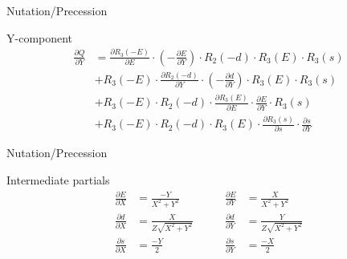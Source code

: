 \documentclass[14pt,table,t, c]{beamer}
\begin{document}
\begin{frame}{Nutation/Precession}
\begin{block}{Y-component}
\vspace*{-\baselineskip}\setlength\belowdisplayskip{0pt}\setlength\abovedisplayskip{0pt}
\begin{align*}
\frac{\partial Q}{\partial Y}
&= \frac{\partial R_3(-E)}{\partial E} \cdot (-\frac{\partial E}{\partial Y}) \cdot R_2(-d) \cdot R_3(E) \cdot R_3(s) \\
&+ R_3(-E) \cdot \frac{\partial R_2(-d)}{\partial Y} \cdot (-\frac{\partial d}{\partial Y})\cdot R_3(E) \cdot R_3(s) \\
&+ R_3(-E) \cdot R_2(-d) \cdot \frac{\partial R_3(E)}{\partial E} \cdot \frac{\partial E}{\partial Y} \cdot R_3(s)\\
&+ R_3(-E) \cdot R_2(-d) \cdot R_3(E) \cdot \frac{\partial R_3(s)}{\partial s} \cdot \frac{\partial s}{\partial Y}
\end{align*}
\end{block}
\end{frame}

\begin{frame}{Nutation/Precession}
\begin{block}{Intermediate partials}
\vspace*{-\baselineskip}\setlength\belowdisplayskip{0pt}\setlength\abovedisplayskip{0pt}
\begin{align*}
\frac{\partial E}{\partial X} &= \frac{-Y}{X^2 + Y^2} \qquad & \frac{\partial E}{\partial Y} &= \frac{X}{X^2 + Y^2} \\
\frac{\partial d}{\partial X} &= \frac{X}{Z\sqrt{X^2 + Y^2}} \qquad &\frac{\partial d}{\partial Y} &=
\frac{Y}{Z\sqrt{X^2 + Y^2}}\\
\frac{\partial s}{\partial X} &= \frac{-Y}{2} \qquad & \frac{\partial s}{\partial Y} &= \frac{-X}{2}
\end{align*}
\end{block}
\end{frame}
\end{document}
